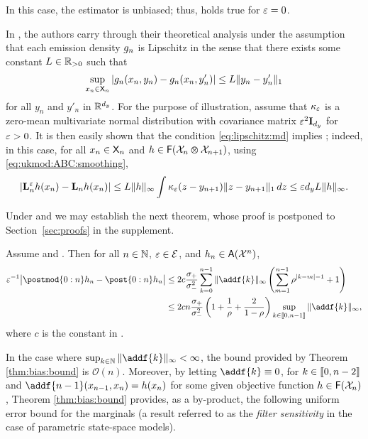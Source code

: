 \begin{example} \label{ex:exact:algorithm:cont}
In this case, the estimator is unbiased; thus,  holds true for $\varepsilon = 0$. 
\end{example}

\begin{example} In \cite{martin:jasra:singh:whiteley:delmoral:maccoy:2014}, the authors carry through their theoretical analysis under the assumption that each emission density $g_{n}$ is Lipschitz in the sense that there exists some constant $L \in \mathbb{R}_{> 0}$ such that   
\begin{equation} \label{eq:lipschitz:md}
\sup_{x_n \in \Xset_n} \left| \md{n}(x_n, y_n) - \md{n}(x_n, y'_n) \right| \leq L \| y_n - y_n' \|_1
\end{equation}
for all $y_n$ and $y'_n$ in $\mathbb{R}^{d_y}$. For the purpose of illustration, assume that $\kappa_\varepsilon$ is a zero-mean multivariate normal distribution with covariance matrix $\varepsilon^2 \mathbf{I}_{d_y}$ for $\varepsilon > 0$. It is then easily shown that the condition \eqref{eq:lipschitz:md} implies ; indeed, in this case, for all $x_n \in \mathsf{X}_n$ and $h \in \mathsf{F}(\mathcal{X}_n \varotimes \mathcal{X}_{n + 1})$, using \eqref{eq:ukmod:ABC:smoothing}, 
$$
\left| \mathbf{L}_{n}^\varepsilon h (x_n) - \mathbf{L}_n h (x_n) \right| \leq L  \|h \|_\infty \int \kappa_\varepsilon(z - y_{n + 1}) \| z - y_{n + 1} \|_1 \, d z \leq \varepsilon d_y L \|h \|_\infty. 
$$
\end{example}

Under  and  we may establish the next theorem, whose proof is postponed to Section~\ref{sec:proofs} in the supplement.  

\begin{theorem} \label{thm:bias:bound}
    Assume  and . Then for all $n \in \mathbb{N}$, $\varepsilon \in \mathcal{E}$, and $h_n \in \mathsf{A}(\mathcal{X}^n)$, 
    \begin{align*}
        \precpar^{-1} \big| \postmod{0:n} h_n -  \post{0:n} h_n \big| 
        &\leq 2 c \frac{\udup}{\udlow^2} \sum_{k = 0}^{n - 1} \| \addf{k} \|_\infty \left( \sum_{m = 1}^{n - 1} \rho^{|k - m| - 1} + 1 \right) \\
        &\leq 2 c n \frac{\udup}{\udlow^2} \left( 1 + \frac{1}{\rho} + \frac{2}{1 - \rho} \right) \sup_{k \in \intvect{0}{n - 1}} \| \addf{k} \|_\infty,   
    \end{align*}
where $c$ is the constant in . 
\end{theorem}
In the case where $\sup_{k \in \nset} \| \addf{k} \|_\infty < \infty$, the bound provided by Theorem \ref{thm:bias:bound} is $\mathcal{O}(n)$. Moreover, by letting $\addf{k} \equiv 0$, for $k \in \llbracket 0, n - 2 \rrbracket$ and $\addf{n - 1}(x_{n - 1}, x_n) = h(x_n)$ for some given objective function $h \in \mathsf{F}(\mathcal{X}_n)$, Theorem \ref{thm:bias:bound} provides, as a by-product, the following uniform error bound for the marginals (a result referred to as the \emph{filter sensitivity} in the case of parametric state-space models).  

